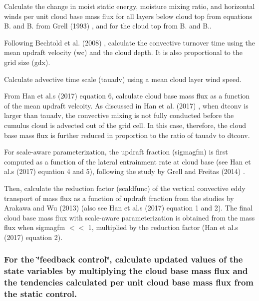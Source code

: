 \begin{DoxyItemize}
\item Calculate the change in moist static energy, moisture mixing ratio, and horizontal winds per unit cloud base mass flux for all layers below cloud top from equations B. and B. from Grell (1993) \cite{grell_1993}, and for the cloud top from B. and B..
\item Following Bechtold et al. (2008) \cite{bechtold_et_al_2008}, calculate the convective turnover time using the mean updraft velocity (wc) and the cloud depth. It is also proportional to the grid size (gdx).
\item Calculate advective time scale (tauadv) using a mean cloud layer wind speed.
\item From Han et al.\textquotesingle{}s (2017) \cite{han_et_al_2017} equation 6, calculate cloud base mass flux as a function of the mean updraft velcoity. As discussed in Han et al. (2017) \cite{han_et_al_2017} , when dtconv is larger than tauadv, the convective mixing is not fully conducted before the cumulus cloud is advected out of the grid cell. In this case, therefore, the cloud base mass flux is further reduced in proportion to the ratio of tauadv to dtconv.
\item For scale-\/aware parameterization, the updraft fraction (sigmagfm) is first computed as a function of the lateral entrainment rate at cloud base (see Han et al.\textquotesingle{}s (2017) \cite{han_et_al_2017} equation 4 and 5), following the study by Grell and Freitas (2014) \cite{grell_and_freitus_2014}.
\item Then, calculate the reduction factor (scaldfunc) of the vertical convective eddy transport of mass flux as a function of updraft fraction from the studies by Arakawa and Wu (2013) \cite{arakawa_and_wu_2013} (also see Han et al.\textquotesingle{}s (2017) \cite{han_et_al_2017} equation 1 and 2). The final cloud base mass flux with scale-\/aware parameterization is obtained from the mass flux when sigmagfm $<$$<$ 1, multiplied by the reduction factor (Han et al.\textquotesingle{}s (2017) \cite{han_et_al_2017} equation 2).
\end{DoxyItemize}

\subsubsection*{For the \char`\"{}feedback control\char`\"{}, calculate updated values of the state variables by multiplying the cloud base mass flux and the tendencies calculated per unit cloud base mass flux from the static control.}


